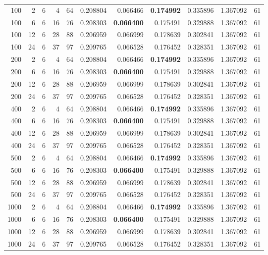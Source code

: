 \begin{table}
\begin{tabular}{rrrrrrrrrrr}
100 & 2 & 6 & 4 & 64 & 0.208804 & 0.066466 & \textbf{0.174992} & 0.335896 & 1.367092 & 61 \\
100 & 6 & 6 & 16 & 76 & 0.208303 & \textbf{0.066400} & 0.175491 & 0.329888 & 1.367092 & 61 \\
100 & 12 & 6 & 28 & 88 & 0.206959 & 0.066999 & 0.178639 & 0.302841 & 1.367092 & 61 \\
100 & 24 & 6 & 37 & 97 & 0.209765 & 0.066528 & 0.176452 & 0.328351 & 1.367092 & 61 \\
200 & 2 & 6 & 4 & 64 & 0.208804 & 0.066466 & \textbf{0.174992} & 0.335896 & 1.367092 & 61 \\
200 & 6 & 6 & 16 & 76 & 0.208303 & \textbf{0.066400} & 0.175491 & 0.329888 & 1.367092 & 61 \\
200 & 12 & 6 & 28 & 88 & 0.206959 & 0.066999 & 0.178639 & 0.302841 & 1.367092 & 61 \\
200 & 24 & 6 & 37 & 97 & 0.209765 & 0.066528 & 0.176452 & 0.328351 & 1.367092 & 61 \\
400 & 2 & 6 & 4 & 64 & 0.208804 & 0.066466 & \textbf{0.174992} & 0.335896 & 1.367092 & 61 \\
400 & 6 & 6 & 16 & 76 & 0.208303 & \textbf{0.066400} & 0.175491 & 0.329888 & 1.367092 & 61 \\
400 & 12 & 6 & 28 & 88 & 0.206959 & 0.066999 & 0.178639 & 0.302841 & 1.367092 & 61 \\
400 & 24 & 6 & 37 & 97 & 0.209765 & 0.066528 & 0.176452 & 0.328351 & 1.367092 & 61 \\
500 & 2 & 6 & 4 & 64 & 0.208804 & 0.066466 & \textbf{0.174992} & 0.335896 & 1.367092 & 61 \\
500 & 6 & 6 & 16 & 76 & 0.208303 & \textbf{0.066400} & 0.175491 & 0.329888 & 1.367092 & 61 \\
500 & 12 & 6 & 28 & 88 & 0.206959 & 0.066999 & 0.178639 & 0.302841 & 1.367092 & 61 \\
500 & 24 & 6 & 37 & 97 & 0.209765 & 0.066528 & 0.176452 & 0.328351 & 1.367092 & 61 \\
1000 & 2 & 6 & 4 & 64 & 0.208804 & 0.066466 & \textbf{0.174992} & 0.335896 & 1.367092 & 61 \\
1000 & 6 & 6 & 16 & 76 & 0.208303 & \textbf{0.066400} & 0.175491 & 0.329888 & 1.367092 & 61 \\
1000 & 12 & 6 & 28 & 88 & 0.206959 & 0.066999 & 0.178639 & 0.302841 & 1.367092 & 61 \\
1000 & 24 & 6 & 37 & 97 & 0.209765 & 0.066528 & 0.176452 & 0.328351 & 1.367092 & 61 \\
\bottomrule
\end{tabular}
\end{table}

